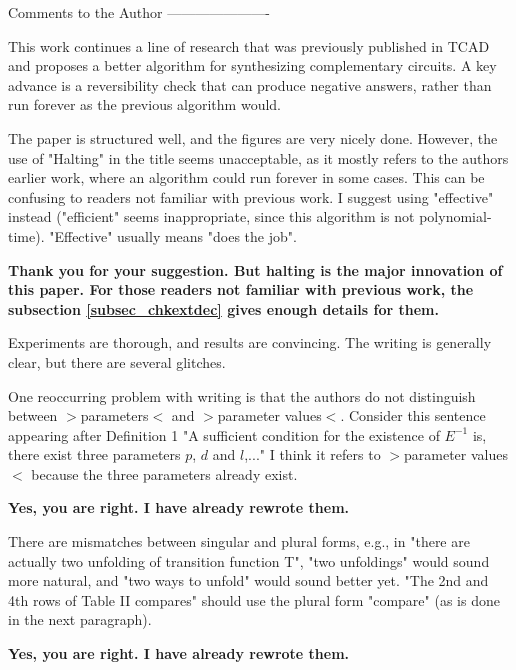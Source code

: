 \documentclass[journal]{IEEEtran}
\begin{document}
Comments to the Author
----------------------

This work continues a line of research that was previously published in TCAD and
proposes a better algorithm for synthesizing complementary circuits.
A key advance is a reversibility check that can produce negative answers,
rather than run forever as the previous algorithm would.

The paper is structured well, and the figures are very nicely done.
However, the use of "Halting" in the title seems unacceptable,
as it mostly refers to the authors earlier work,
where an algorithm could run forever in some cases.
This can be confusing to readers not familiar with previous work.
I suggest using "effective" instead ("efficient" seems inappropriate,
since this algorithm is not polynomial-time). "Effective" usually means "does the job".

\smallskip

\textbf{Thank you for your suggestion.
But halting is the major innovation of this paper.
For those readers not familiar with previous work,
the subsection \ref{subsec_chkextdec} gives enough details for them.
}

\bigskip

Experiments are thorough, and results are convincing.
The writing is generally clear, but there are several glitches.

One reoccurring problem with writing is that the authors do not distinguish between $>$parameters$<$ and $>$parameter values$<$.
Consider this sentence appearing after Definition 1 "A sufficient condition for the existence of $E^{-1}$ is,
there exist three parameters $p$, $d$ and $l$,..."  I think it refers to $>$parameter values$<$ because the three parameters already exist.

\smallskip

\textbf{Yes,
you are right.
I have already rewrote them.}

\bigskip

There are mismatches between singular and plural forms, e.g., in
"there are actually two unfolding of transition function T", "two unfoldings" would sound more natural,
and "two ways to unfold"  would sound better yet.
"The 2nd and 4th rows of Table II compares" should use the plural form "compare" (as is done in the next paragraph).

\smallskip

\textbf{Yes,
you are right.
I have already rewrote them.}

\bigskip
\end{document}

